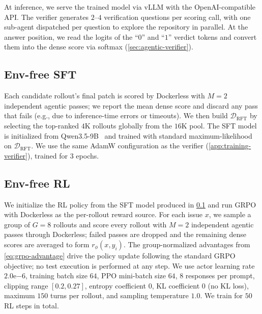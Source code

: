 \documentclass{llmxive}
\providecommand{\todo}[1]{}
\providecommand{\approach}{Dockerless\xspace}
\providecommand{\zeng}[1]{\textbf{[Zeng: #1]}}
\begin{document}
At inference, we serve the trained model via vLLM with the OpenAI-compatible API.
The verifier generates $2$--$4$ verification questions per scoring call, with one sub-agent dispatched per question to explore the repository in parallel.
At the answer position, we read the logits of the ``$0$'' and ``$1$'' verdict tokens and convert them into the dense score via softmax (\cref{sec:agentic-verifier}).

\subsection{Env-free SFT}
\label{app:training-sft}

Each candidate rollout's final patch is scored by \approach with $M{=}2$ independent agentic passes; we report the mean dense score and discard any pass that fails (e.g., due to inference-time errors or timeouts).
We then build $\mathcal{D}_{\text{RFT}}$ by selecting the top-ranked $4$K rollouts globally from the $16$K pool.
The SFT model is initialized from Qwen3.5-9B~\citep{team2026qwen35} and trained with standard maximum-likelihood on $\mathcal{D}_{\text{RFT}}$.
We use the same AdamW configuration as the verifier (\cref{app:training-verifier}), trained for $3$ epochs.

\subsection{Env-free RL}
\label{app:training-rl}

We initialize the RL policy from the SFT model produced in \cref{app:training-sft} and run GRPO~\citep{shao2024deepseekmath} with \approach as the per-rollout reward source.
For each issue $x$, we sample a group of $G{=}8$ rollouts and score every rollout with $M{=}2$ independent agentic passes through \approach; failed passes are dropped and the remaining dense scores are averaged to form $r_\phi(x, y_i)$.
The group-normalized advantages from \cref{eq:grpo-advantage} drive the policy update following the standard GRPO objective; no test execution is performed at any step.
We use actor learning rate $2.0\mathrm{e}{-6}$, training batch size $64$, PPO mini-batch size $64$, $8$ responses per prompt, clipping range $[0.2, 0.27]$, entropy coefficient $0$, KL coefficient $0$ (no KL loss), maximum $150$ turns per rollout, and sampling temperature $1.0$.
We train for $50$ RL steps in total.
\end{document}
